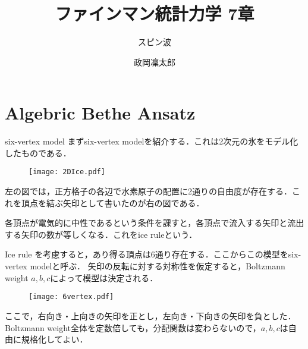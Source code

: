 \documentclass[dvipdfmx,9pt]{beamer}
\numberwithin{equation}{section}
\begin{document}
\title{ファインマン統計力学 7章}
\subtitle{スピン波}
\author{政岡凜太郎}
\frame{\titlepage}

\section{Algebric Bethe Ansatz}
\begin{frame}{six-vertex model}
    まずsix-vertex modelを紹介する．これは2次元の氷をモデル化したものである．
    \begin{figure}[H]
        \centering
        \texttt{[image: 2DIce.pdf]}
    \end{figure}
    左の図では，正方格子の各辺で水素原子の配置に2通りの自由度が存在する．これを頂点を結ぶ矢印として書いたのが右の図である．

    各頂点が電気的に中性であるという条件を課すと，各頂点で流入する矢印と流出する矢印の数が等しくなる．これをice ruleという．
\end{frame}

\begin{frame}
    Ice rule を考慮すると，あり得る頂点は6通り存在する．ここからこの模型をsix-vertex modelと呼ぶ．
    矢印の反転に対する対称性を仮定すると，Boltzmann weight $a,b,c$によって模型は決定される．
    \begin{figure}[H]
        \centering
        \texttt{[image: 6vertex.pdf]}
    \end{figure}
    ここで，右向き・上向きの矢印を正とし，左向き・下向きの矢印を負とした．
    Boltzmann weight全体を定数倍しても，分配関数は変わらないので，$a, b, c$は自由に規格化してよい．
\end{frame}
\end{document}
